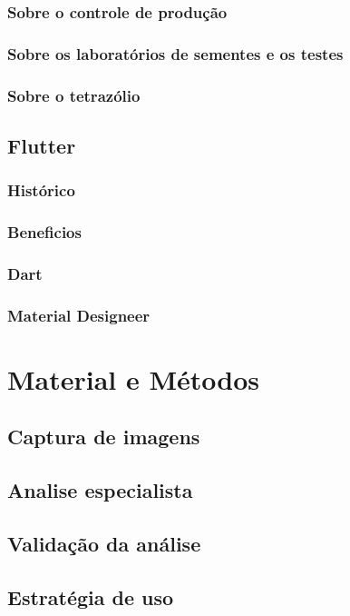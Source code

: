 \subsection{Sobre o controle de produção}
\subsection{Sobre os laboratórios de sementes e os testes}
\subsection{Sobre o tetrazólio}

\section{Flutter}
\subsection{Histórico}
\subsection{Beneficios}
\subsection{Dart}
\subsection{Material Designeer}


\chapter{Material e Métodos}
\section{Captura de imagens}
\section{Analise especialista}
\section{Validação da análise}
\section{Estratégia de uso}


